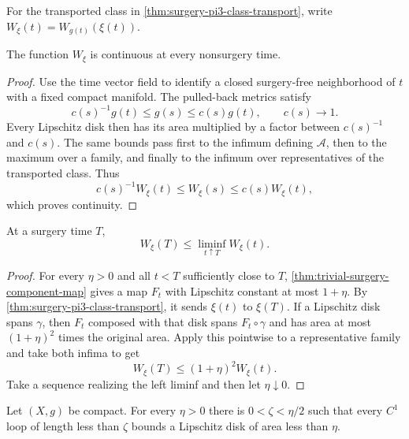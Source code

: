 For the transported class in \ref{thm:surgery-pi3-class-transport}, write
$W_\xi(t)=W_{g(t)}(\xi(t))$.

\begin{lemma}
\label{lem:loop-width-regular-continuity}
\notready
The function $W_\xi$ is continuous at every nonsurgery time.
\end{lemma}

\begin{proof}
Use the time vector field to identify a closed surgery-free neighborhood of
$t$ with a fixed compact manifold.  The pulled-back metrics satisfy
\[
 c(s)^{-1}g(t)\le g(s)\le c(s)g(t),
 \qquad c(s)\longrightarrow1.
\]
Every Lipschitz disk then has its area multiplied by a factor between
$c(s)^{-1}$ and $c(s)$.  The same bounds pass first to the infimum defining
$\mathcal A$, then to the maximum over a family, and finally to the infimum
over representatives of the transported class.  Thus
\[
 c(s)^{-1}W_\xi(t)\le W_\xi(s)\le c(s)W_\xi(t),
\]
which proves continuity.
\end{proof}

\begin{lemma}
\label{lem:loop-width-surgery-lower-semicontinuity}
\notready
At a surgery time $T$,
\[
 W_\xi(T)\le\liminf_{t\uparrow T}W_\xi(t).
\]
\end{lemma}

\begin{proof}
For every $\eta>0$ and all $t<T$ sufficiently close to $T$,
\ref{thm:trivial-surgery-component-map} gives a map $F_t$ with Lipschitz
constant at most $1+\eta$.  By
\ref{thm:surgery-pi3-class-transport}, it sends $\xi(t)$ to $\xi(T)$.  If a
Lipschitz disk spans $\gamma$, then $F_t$ composed with that disk spans
$F_t\circ\gamma$ and has area at most $(1+\eta)^2$ times the original area.
Apply this pointwise to a representative family and take both infima to get
\[
 W_\xi(T)\le(1+\eta)^2W_\xi(t).
\]
Take a sequence realizing the left liminf and then let $\eta\downarrow0$.
\end{proof}

\begin{lemma}
\label{lem:short-loops-small-disk}
\notready
Let $(X,g)$ be compact.  For every $\eta>0$ there is
$0<\zeta<\eta/2$ such that every $C^1$ loop of length less than $\zeta$
bounds a Lipschitz disk of area less than $\eta$.
\end{lemma}

